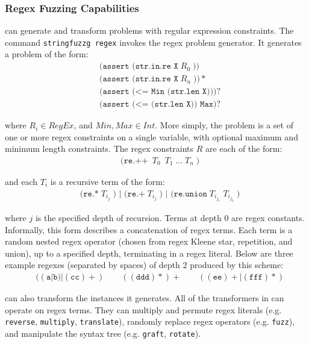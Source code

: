 \subsubsection{Regex Fuzzing Capabilities}

\fuzzer{} can generate
and transform problems with regular expression constraints. The
command \texttt{stringfuzzg regex} invokes the regex problem
generator. It generates a problem of the form:
\begin{align*}
    & \texttt{(assert (str.in.re X}\; R_0\; \texttt{))} \\
    & \texttt{(assert (str.in.re X}\; R_n\; \texttt{))}* \\
    & \texttt{(assert (<= Min (str.len X)))}? \\
    & \texttt{(assert (<= (str.len X)) Max)}?
\end{align*}

where $R_i \in RegEx$, and $Min, Max \in Int$. More simply, the
problem is a set of one or more regex constraints on a single
variable, with optional maximum and minimum length constraints. The
regex constraints $R$ are each of the form:
\begin{align*}
  & \texttt{(re.++}\; \ T_0\; \ T_1\; \texttt{...}\; T_n\; \texttt{)}
\end{align*}

and each $T_i$ is a recursive term of the form:
\begin{align*}
  & \texttt{(re.*}\; T_{i_j}\; \texttt{) | (re.+}\; T_{i_j}\;
  \texttt{) | (re.union}\; T_{i_{j_1}}\; T_{i_{j_2}}\; \texttt{)}
\end{align*}

where $j$ is the specified depth of recursion. Terms at depth 0 are
regex constants. Informally, this form describes a concatenation of
regex terms. Each term is a random nested regex operator (chosen from
regex Kleene star, repetition, and union), up to a specified depth,
terminating in a regex literal. Below are three example regexes
(separated by spaces) of depth 2 produced by this scheme:
\begin{align*}
  & ((\texttt{a}|\texttt{b})|(\texttt{cc})+)\quad\quad
  ((\texttt{ddd})*)+\quad\quad ((\texttt{ee})+|(\texttt{fff})*)
\end{align*}

\fuzzer{} can also transform the instances it generates. All of the
transformers in \transformer{} can operate on regex terms. They can
multiply and permute regex literals (e.g. \texttt{reverse},
\texttt{multiply}, \texttt{translate}), randomly replace regex
operators (e.g. \texttt{fuzz}), and manipulate the syntax tree
(e.g. \texttt{graft}, \texttt{rotate}).

